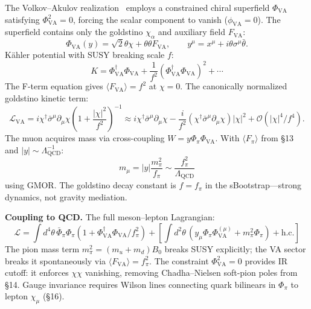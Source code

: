 \documentclass[11pt,a4paper]{article}
\newcommand{\Lqcd}{\Lambda_{\text{QCD}}}
\newcommand{\fpi}{f_\pi}
\newcommand{\mpi}{m_\pi}
\newcommand{\mmu}{m_\mu}
\begin{document}
The Volkov--Akulov realization~\cite{VolkovAkulov:1973} employs a constrained chiral superfield $\Phi_{\text{VA}}$ satisfying $\Phi_{\text{VA}}^2 = 0$, forcing the scalar component to vanish ($\phi_{\text{VA}}=0$).  The superfield contains only the goldstino $\chi_\alpha$ and auxiliary field $F_{\text{VA}}$:
\begin{equation}
\Phi_{\text{VA}}(y) = \sqrt{2}\theta\chi + \theta\theta F_{\text{VA}}, \qquad y^\mu = x^\mu + i\theta\sigma^\mu\bar{\theta}.
\end{equation}
K\"ahler potential with SUSY breaking scale $f$:
\begin{equation}
K = \Phi_{\text{VA}}^\dagger\Phi_{\text{VA}} + \frac{1}{f^2}(\Phi_{\text{VA}}^\dagger\Phi_{\text{VA}})^2 + \cdots
\end{equation}
The F-term equation gives $\langle F_{\text{VA}}\rangle = f^2$ at $\chi=0$.  The canonically normalized goldstino kinetic term:
\begin{equation}
\mathcal{L}_{\text{VA}} = i\chi^\dagger\bar{\sigma}^\mu\partial_\mu\chi\left(1 + \frac{|\chi|^2}{f^2}\right)^{-1} \approx i\chi^\dagger\bar{\sigma}^\mu\partial_\mu\chi - \frac{i}{f^2}(\chi^\dagger\bar{\sigma}^\mu\partial_\mu\chi)|\chi|^2 + \mathcal{O}(|\chi|^4/f^4).
\end{equation}
The muon acquires mass via cross-coupling $W = y\Phi_{\pi}\Phi_{\text{VA}}$.  With $\langle F_\pi\rangle$ from \S 13 and $|y| \sim \Lqcd^{-1}$:
\begin{equation}
\mmu = |y|\frac{\mpi^2}{\fpi} \sim \frac{\fpi^2}{\Lqcd}
\end{equation}
using GMOR.  The goldstino decay constant is $f=\fpi$ in the sBootstrap---strong dynamics, not gravity mediation.

\textbf{Coupling to QCD.}  The full meson--lepton Lagrangian:
\begin{equation}
\mathcal{L} = \int d^4\theta\,\bar{\Phi}_\pi\Phi_\pi(1 + \Phi_{\text{VA}}^\dagger\Phi_{\text{VA}}/\fpi^2) + \left[\int d^2\theta\,(y_\mu\Phi_\pi\Phi_{\text{VA}}^{(\mu)} + \mpi^2\Phi_\pi) + \text{h.c.}\right]
\end{equation}
The pion mass term $\mpi^2 = (m_u+m_d)B_0$ breaks SUSY explicitly; the VA sector breaks it spontaneously via $\langle F_{\text{VA}}\rangle=\fpi^2$.  The constraint $\Phi_{\text{VA}}^2=0$ provides IR cutoff: it enforces $\chi\chi$ vanishing, removing Chadha--Nielsen soft-pion poles from \S 14.  Gauge invariance requires Wilson lines connecting quark bilinears in $\Phi_\pi$ to lepton $\chi_\mu$ (\S 16).
\end{document}
